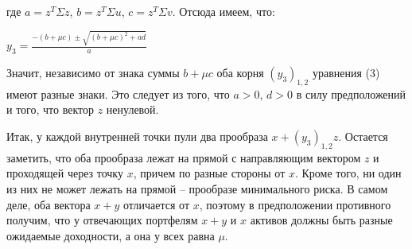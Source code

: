 \documentclass[12pt,a4 paper]{book}
\begin{document}
\begin{enumerate}
где $a=z^T\Sigma z$, $b=z^T\Sigma u$,  $c=z^T\Sigma v$. Отсюда имеем, что: 
\begin{center}
$y_3=\frac{-(b+\mu c) \pm \sqrt{(b+\mu c)^2+ad}}{a}$
\end{center}

Значит, независимо от знака суммы $b+\mu c$ оба корня $(y_3)_{1,2}$ уравнения (3) имеют разные знаки. Это следует из того, что  $a>0$, $d>0$ в силу предположений и того, что вектор $z$ ненулевой.

Итак, у каждой внутренней точки пули два прообраза $x+(y_3)_{1,2} z$. Остается заметить, что оба прообраза лежат на прямой с направляющим вектором $z$ и проходящей через точку $x$, причем по разные стороны от $x$. Кроме того, ни один из них не может лежать на прямой -- прообразе минимального риска. В самом деле, оба вектора $x+y$ отличается от $x$, поэтому в предположении противного получим, что у отвечающих портфелям $x+y$ и $x$ активов должны быть разные ожидаемые доходности, а она у всех равна $\mu$.
\end{enumerate}

\newpage
\end{document}
